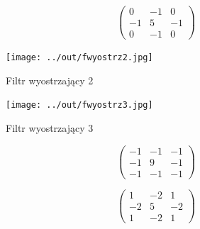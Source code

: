 \documentclass[a4paper,12pt]{article}
\begin{document}
\begin{figure}[h!]
\begin{minipage}[t]{7.5cm}
\end{minipage}
\hfill
\begin{minipage}[t]{7.5cm}
\begin{center}
\[ \left( \begin{array}{ccc}
0 & -1 & 0 \\
-1 & 5 & -1 \\
0 & -1 & 0 \end{array} \right)\] 
\end{center}
\end{minipage}
\end{figure}

\begin{figure}[h!]
\begin{minipage}[t]{7.5cm}
\begin{center}
\texttt{[image: ../out/fwyostrz2.jpg]}
\caption{Filtr wyostrzający 2}
\end{center}
\end{minipage}
\hfill
\begin{minipage}[t]{7.5cm}
\begin{center}
\texttt{[image: ../out/fwyostrz3.jpg]}
\caption{Filtr wyostrzający 3}
\end{center}
\end{minipage}
\end{figure}

\begin{figure}[h!]
\begin{minipage}[t]{7.5cm}
\begin{center}
\[ \left( \begin{array}{ccc}
-1 & -1 & -1 \\
-1 & 9 & -1 \\
-1 & -1 & -1 \end{array} \right)\] 
\end{center}
\end{minipage}
\hfill
\begin{minipage}[t]{7.5cm}
\begin{center}
\[ \left( \begin{array}{ccc}
1 & -2 & 1 \\
-2 & 5 & -2 \\
1 & -2 & 1 \end{array} \right)\] 
\end{center}
\end{minipage}
\end{figure}
\end{document}
